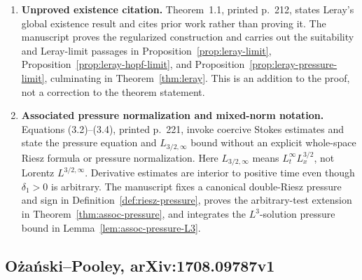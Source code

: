 \documentclass[11pt,reqno]{amsart}
\begin{document}
\begin{enumerate}
\item \textbf{Unproved existence citation.} Theorem~1.1, printed p.~212, states Leray's global existence result and cites prior work rather than proving it. The manuscript proves the regularized construction and carries out the suitability and Leray-limit passages in Proposition~\ref{prop:leray-limit}, Proposition~\ref{prop:leray-hopf-limit}, and Proposition~\ref{prop:leray-pressure-limit}, culminating in Theorem~\ref{thm:leray}. This is an addition to the proof, not a correction to the theorem statement.

\item \textbf{Associated pressure normalization and mixed-norm notation.} Equations (3.2)--(3.4), printed p.~221, invoke coercive Stokes estimates and state the pressure equation and \(L_{3/2,\infty}\) bound without an explicit whole-space Riesz formula or pressure normalization. Here \(L_{3/2,\infty}\) means \(L^\infty_tL^{3/2}_x\), not Lorentz \(L^{3/2,\infty}\). Derivative estimates are interior to positive time even though \(\delta_1>0\) is arbitrary. The manuscript fixes a canonical double-Riesz pressure and sign in Definition~\ref{def:riesz-pressure}, proves the arbitrary-test extension in Theorem~\ref{thm:assoc-pressure}, and integrates the \(L^3\)-solution pressure bound in Lemma~\ref{lem:assoc-pressure-L3}.
\end{enumerate}

\subsection*{Ożański--Pooley, arXiv:1708.09787v1}
\end{document}
